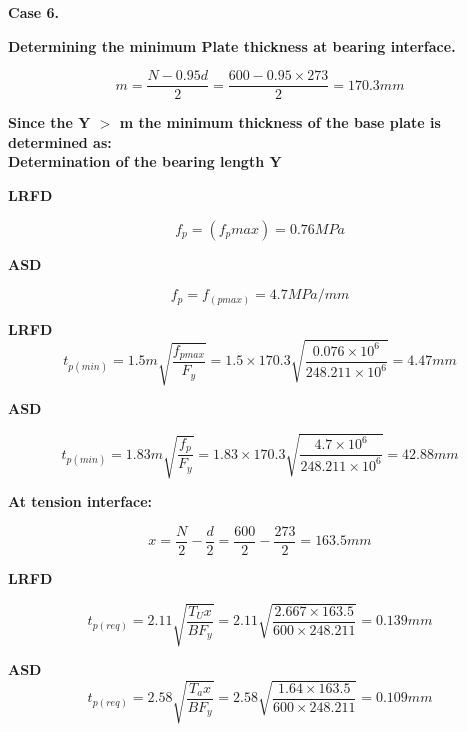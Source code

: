 {\textbf{Case 6.}

\textbf{Determining the minimum Plate thickness at bearing interface.} 

\begin{equation}
m = \frac{{N}-{0}.{95}{d}}{{2}} = \frac{{600}-{0}.{95}\times{273}}{{2}}  = 170.3mm
\end{equation}



\textbf{Since the Y \( > \) m the minimum thickness of the base plate is determined as:}\\

\textbf{Determination of the bearing length Y}

 \textbf{LRFD}

\begin{equation}
{f}_{p} = (f_pmax) = 0.76MPa
\end{equation}

\textbf{ASD}

\begin{equation}
 f_p = f_(pmax)  = 4.7MPa/mm
\end{equation}



\textbf{LRFD}
\begin{equation}
t_{p(min)} = 1.5m\sqrt{\frac{f_{pmax}}{F_y}} = 1.5\times170.3\sqrt{\frac{0.076 \times10^6}{248.211\times 10^6}} = 4.47mm
\end{equation}


\textbf{ASD}

\begin{equation}
t_{p(min)} = 1.83m\sqrt{\frac{f_p}{F_y}} = 1.83\times170.3\sqrt{\frac{4.7\times 10^6}{248.211\times 10^6}} = 42.88mm
\end{equation}


\textbf{At tension interface:}

\begin{equation}
x=\frac{N}{2} -\frac{d}{2} = \frac{600}{2}- \frac{273}{2}= 163.5mm  
\end{equation}



\textbf{LRFD}

\begin{equation}
{t}_{{p}({req})} = 2.11 \sqrt{\frac{T_{U}x}{{BF}_{y}}} 
= 2.11 \sqrt{\frac{2.667\times 163.5}{600 \times248.211}} = 0.139mm
\end{equation}


\textbf{ASD}
\begin{equation}
{t}_{{p}({req})} = 2.58 \sqrt{\frac{T_{a}x}{{BF}_{y}}} 
= 2.58 \sqrt{\frac{1.64\times 163.5}{600 \times248.211}}
= 0.109mm     
\end{equation}


}
